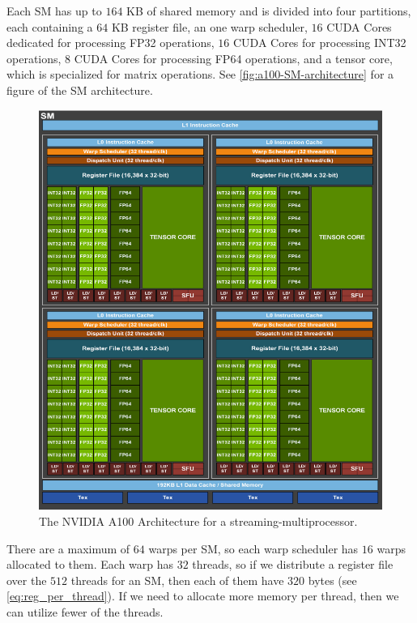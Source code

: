 Each SM has up to $164$ KB of shared memory and is divided into four partitions, each containing a $64$ KB register file, an one warp scheduler, $16$ CUDA Cores dedicated for processing FP32 operations, $16$ CUDA Cores for processing INT32 operations, $8$ CUDA Cores for processing FP64 operations, and a tensor core, which is specialized for matrix operations. See \autoref{fig:a100-SM-architecture} for a figure of the SM architecture.

\begin{figure}[H]
\centering
\includegraphics[scale=0.3]{images/nvidia-a100-architecture}
\caption{The NVIDIA A100 Architecture for a streaming-multiprocessor. \cite[Figure 5]{nvidia-a100-architecture}}
\label{fig:a100-SM-architecture}
\end{figure}

There are a maximum of $64$ warps per SM, so each warp scheduler has $16$ warps allocated to them. Each warp has $32$ threads, so if we distribute a register file over the $512$ threads for an SM, then each of them have $320$ bytes (see \autoref{eq:reg_per_thread}). If we need to allocate more memory per thread, then we can utilize fewer of the threads.

